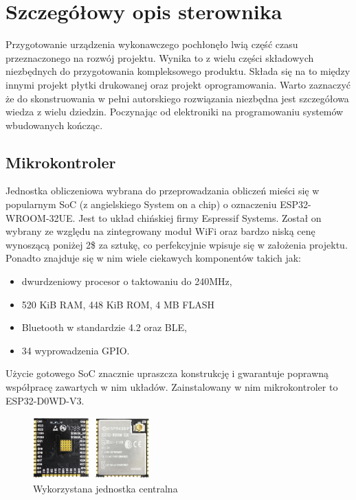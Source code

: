 
    \chapter{Szczegółowy opis sterownika}
        Przygotowanie urządzenia wykonawczego pochłonęło lwią część czasu przeznaczonego na rozwój projektu. Wynika to z wielu części składowych niezbędnych do przygotowania kompleksowego produktu. Składa się na to między innymi projekt płytki drukowanej oraz projekt oprogramowania. Warto zaznaczyć że do skonstruowania w pełni autorskiego rozwiązania niezbędna jest szczegółowa wiedza z wielu dziedzin. Poczynając od elektroniki na programowaniu systemów wbudowanych kończąc.
    
    
        \section{Mikrokontroler}
            Jednostka obliczeniowa wybrana do przeprowadzania obliczeń mieści się w popularnym SoC (z angielskiego System on a chip) o oznaczeniu ESP32-WROOM-32UE. Jest to układ chińskiej firmy Espressif Systems. Został on wybrany ze względu na zintegrowany moduł WiFi oraz bardzo niską cenę wynoszącą poniżej 2\$ za sztukę, co perfekcyjnie wpisuje się w założenia projektu. Ponadto znajduje się w nim wiele ciekawych komponentów takich jak:
    
            \begin{itemize}
              \item dwurdzeniowy procesor o taktowaniu do 240MHz,
              \item 520 KiB RAM, 448 KiB ROM, 4 MB FLASH
              \item Bluetooth w standardzie 4.2 oraz BLE,
              \item 34 wyprowadzenia GPIO.
            \end{itemize}
            
            Użycie gotowego SoC znacznie upraszcza konstrukcję i gwarantuje poprawną współpracę zawartych w nim układów. Zainstalowany w nim mikrokontroler to ESP32-D0WD-V3. 
    
    
            \begin{figure}[ht]
              \centering
              \includegraphics[width=0.4\textwidth]{img/esp32.jpg}
              \caption{Wykorzystana jednostka centralna}
              \label{esp}
            \end{figure}
    
